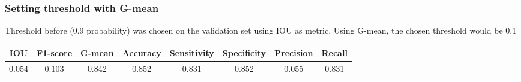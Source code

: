 \documentclass{beamer}
\begin{document}
	\begin{frame}
		\frametitle{Setting threshold with G-mean}
		Threshold before (0.9 probability) was chosen on the validation set using IOU as metric. Using G-mean, the chosen threshold would be 0.1
		
		\scriptsize
		\begin{table}[h]
			\centering
			\begin{tabular}{cccccccc}
			\hline
			\textbf{IOU}	& \textbf{F1-score}	& \textbf{G-mean} &\textbf{Accuracy}	& \textbf{Sensitivity} & \textbf{Specificity} & \textbf{Precision} & \textbf{Recall}\\
			\hline
			0.054 & 0.103 & 0.842 & 0.852 & 0.831 & 0.852 & 0.055 & 0.831\\
			\hline
			\end{tabular}
		\end{table}
		

\end{frame}
\end{document}
